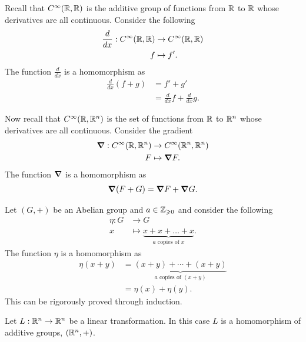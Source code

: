 \documentclass{ximera}
\begin{document}
\begin{example}[Derivatives]\label{EG:der}
  Recall that $C^\infty(\mathbb R,\mathbb R)$ is the additive group of functions
  from $\mathbb R$ to $\mathbb R$ whose derivatives are all continuous. Consider the
  following
  \begin{align*}
    \frac{d}{dx}:C^\infty(\mathbb R,\mathbb R) &\to C^\infty(\mathbb R,\mathbb R) \\
      f &\mapsto f'.
  \end{align*}
  The function $\frac{d}{dx}$ is a homomorphism as
  \begin{align*}
    \frac{d}{dx}(f+ g) &= f' + g' \\
    &= \frac{d}{dx}f + \frac{d}{dx}g.
  \end{align*}
\end{example}


\begin{example}\label{EG:grad}
  Now recall that $C^\infty(\mathbb R,\mathbb R^n)$ is the set of functions from
  $\mathbb R$ to $\mathbb R^n$ whose derivatives are all continuous. Consider the
  gradient
  \begin{align*}
    \boldsymbol\nabla:C^\infty(\mathbb R,\mathbb R^n) &\to C^\infty(\mathbb R^n,\mathbb R^n)\\
    F &\mapsto \boldsymbol\nabla F.
  \end{align*}
  The function $\boldsymbol\nabla$ is a homomorphism as
  \begin{align*}
    \boldsymbol\nabla(F + G) = \boldsymbol\nabla F + \boldsymbol\nabla G.
  \end{align*}
\end{example}


\begin{example}\label{EG:he}
  Let $(G,+)$ be an Abelian group and $a\in\mathbb Z_{\geqslant 0}$ and consider the
  following
  \begin{align*}
    \eta: G &\to G\\
    x &\mapsto \underbrace{x+ x+ \dots+ x}_{\text{$a$ copies of $x$}}.
  \end{align*}
  The function $\eta$ is a homomorphism as
  \begin{align*}
    \eta(x +  y) &= \underbrace{(x+  y) + \cdots + (x+  y)}_{\text{$a$ copies of $(x+ y)$}} \\
    &= \eta(x) +  \eta(y).
  \end{align*}
  This can be rigorously proved through induction.
\end{example}



\begin{example}
  Let $L:\mathbb R^n\to \mathbb R^n$ be a linear transformation. In this case $L$ is
  a homomorphism of additive groups, $(\mathbb R^n,+)$.
\end{example}
\end{document}
